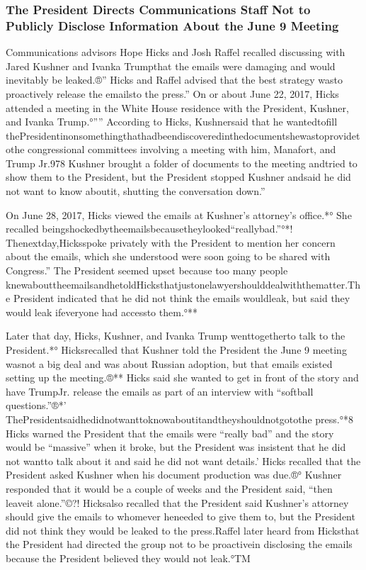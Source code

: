 \subsubsection{The President Directs Communications Staff Not to Publicly Disclose Information About the June 9 Meeting}

Communications advisors Hope Hicks and Josh Raffel recalled discussing with Jared Kushner and Ivanka Trumpthat the emails were damaging and would inevitably be leaked.®” Hicks and Raffel advised that the best strategy wasto proactively release the emailsto the press.” On or about June 22, 2017, Hicks attended a meeting in the White House residence with the President, Kushner, and Ivanka Trump.°”” According to Hicks, Kushnersaid that he wantedtofill thePresidentinonsomethingthathadbeendiscoveredinthedocumentshewastoprovidetothe congressional committees involving a meeting with him, Manafort, and Trump Jr.978 Kushner brought a folder of documents to the meeting andtried to show them to the President, but the President stopped Kushner andsaid he did not want to know aboutit, shutting the conversation down.”

On June 28, 2017, Hicks viewed the emails at Kushner’s attorney’s office.*° She recalled beingshockedbytheemailsbecausetheylooked“reallybad.”°*! Thenextday,Hicksspoke privately with the President to mention her concern about the emails, which she understood were soon going to be shared with Congress.” The President seemed upset because too many people knewabouttheemailsandhetoldHicksthatjustonelawyershoulddealwiththematter.The President indicated that he did not think the emails wouldleak, but said they would leak ifeveryone had accessto them.°**

Later that day, Hicks, Kushner, and Ivanka Trump wenttogetherto talk to the President.*° Hicksrecalled that Kushner told the President the June 9 meeting wasnot a big deal and was about Russian adoption, but that emails existed setting up the meeting.®** Hicks said she wanted to get in front of the story and have TrumpJr. release the emails as part of an interview with “softball questions.”®*’ ThePresidentsaidhedidnotwanttoknowaboutitandtheyshouldnotgotothe press.°*8 Hicks warned the President that the emails were “really bad” and the story would be “massive” when it broke, but the President was insistent that he did not wantto talk about it and said he did not want details.’ Hicks recalled that the President asked Kushner when his document production was due.®° Kushner responded that it would be a couple of weeks and the President said, “then leaveit alone.”©?! Hicksalso recalled that the President said Kushner’s attorney should give the emails to whomever heneeded to give them to, but the President did not think they would be leaked to the press.Raffel later heard from Hicksthat the President had directed the group not to be proactivein disclosing the emails because the President believed they would not leak.°TM

